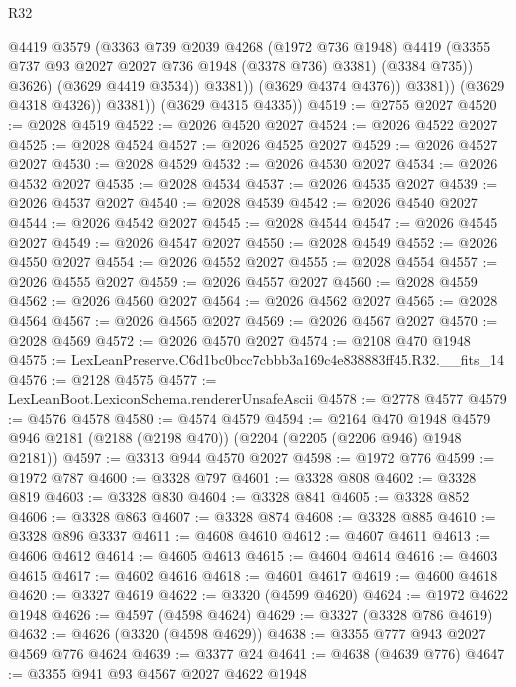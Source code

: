 \begin{lexlean}{R32}
\begin{coremodule}
                          @4419
                          @3579
                          (@3363
                            @739
                            @2039
                            @4268
                            (@1972 @736 @1948)
                            @4419
                            (@3355 @737 @93 @2027 @2027 @736 @1948 (@3378 @736) @3381)
                            (@3384 @735))
                          @3626)
                        (@3629 @4419 @3534))
                      @3381))
                  (@3629 @4374 @4376))
                @3381))
            (@3629 @4318 @4326))
          @3381))
      (@3629 @4315 @4335))
@4519 := @2755 @2027
@4520 := @2028 @4519
@4522 := @2026 @4520 @2027
@4524 := @2026 @4522 @2027
@4525 := @2028 @4524
@4527 := @2026 @4525 @2027
@4529 := @2026 @4527 @2027
@4530 := @2028 @4529
@4532 := @2026 @4530 @2027
@4534 := @2026 @4532 @2027
@4535 := @2028 @4534
@4537 := @2026 @4535 @2027
@4539 := @2026 @4537 @2027
@4540 := @2028 @4539
@4542 := @2026 @4540 @2027
@4544 := @2026 @4542 @2027
@4545 := @2028 @4544
@4547 := @2026 @4545 @2027
@4549 := @2026 @4547 @2027
@4550 := @2028 @4549
@4552 := @2026 @4550 @2027
@4554 := @2026 @4552 @2027
@4555 := @2028 @4554
@4557 := @2026 @4555 @2027
@4559 := @2026 @4557 @2027
@4560 := @2028 @4559
@4562 := @2026 @4560 @2027
@4564 := @2026 @4562 @2027
@4565 := @2028 @4564
@4567 := @2026 @4565 @2027
@4569 := @2026 @4567 @2027
@4570 := @2028 @4569
@4572 := @2026 @4570 @2027
@4574 := @2108 @470 @1948
@4575 := LexLeanPreserve.C6d1bc0bcc7cbbb3a169c4e838883ff45.R32.__fits_14
@4576 := @2128 @4575
@4577 := LexLeanBoot.LexiconSchema.rendererUnsafeAscii
@4578 := @2778 @4577
@4579 := @4576 @4578
@4580 := @4574 @4579
@4594 := @2164
    @470
    @1948
    @4579
    @946
    @2181
    (@2188 (@2198 @470))
    (@2204 (@2205 (@2206 @946) @1948 @2181))
@4597 := @3313 @944 @4570 @2027
@4598 := @1972 @776
@4599 := @1972 @787
@4600 := @3328 @797
@4601 := @3328 @808
@4602 := @3328 @819
@4603 := @3328 @830
@4604 := @3328 @841
@4605 := @3328 @852
@4606 := @3328 @863
@4607 := @3328 @874
@4608 := @3328 @885
@4610 := @3328 @896 @3337
@4611 := @4608 @4610
@4612 := @4607 @4611
@4613 := @4606 @4612
@4614 := @4605 @4613
@4615 := @4604 @4614
@4616 := @4603 @4615
@4617 := @4602 @4616
@4618 := @4601 @4617
@4619 := @4600 @4618
@4620 := @3327 @4619
@4622 := @3320 (@4599 @4620)
@4624 := @1972 @4622 @1948
@4626 := @4597 (@4598 @4624)
@4629 := @3327 (@3328 @786 @4619)
@4632 := @4626 (@3320 (@4598 @4629))
@4638 := @3355 @777 @943 @2027 @4569 @776 @4624
@4639 := @3377 @24
@4641 := @4638 (@4639 @776)
@4647 := @3355 @941 @93 @4567 @2027 @4622 @1948

\end{coremodule}
\end{lexlean}
